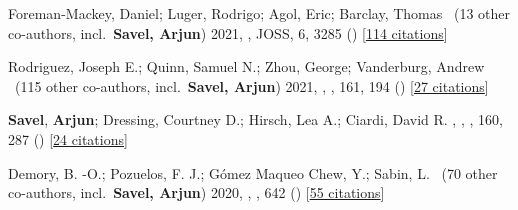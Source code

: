 \item[{\color{numcolor}\scriptsize4}] Foreman-Mackey, Daniel; Luger, Rodrigo; Agol, Eric; Barclay, Thomas \etal\ ({13} other co-authors, incl.\ \textbf{Savel, Arjun}) 2021, , JOSS, {6}, 3285 () [\href{https://ui.adsabs.harvard.edu/abs/2021JOSS....6.3285F}{114 citations}]

\item[{\color{numcolor}\scriptsize3}] Rodriguez, Joseph E.; Quinn, Samuel N.; Zhou, George; Vanderburg, Andrew \etal\ ({115} other co-authors, incl.\ \textbf{Savel, Arjun}) 2021, , \aj, {161}, 194 () [\href{https://ui.adsabs.harvard.edu/abs/2021AJ....161..194R}{27 citations}]

\item[{\color{numcolor}\scriptsize2}] \textbf{Savel}, \textbf{Arjun}; Dressing, Courtney D.; Hirsch, Lea A.; Ciardi, David R. , , \aj, {160}, 287 () [\href{https://ui.adsabs.harvard.edu/abs/2020AJ....160..287S}{24 citations}]

\item[{\color{numcolor}\scriptsize1}] Demory, B. -O.; Pozuelos, F. J.; G{\'o}mez Maqueo Chew, Y.; Sabin, L. \etal\ ({70} other co-authors, incl.\ \textbf{Savel, Arjun}) 2020, , \aanda, {642} () [\href{https://ui.adsabs.harvard.edu/abs/2020A&A...642A..49D}{55 citations}]